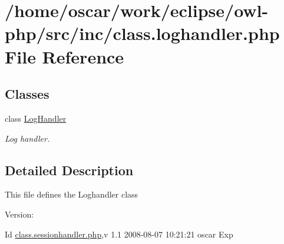 \hypertarget{class_8loghandler_8php}{
\section{/home/oscar/work/eclipse/owl-php/src/inc/class.loghandler.php File Reference}
\label{class_8loghandler_8php}
}
\subsection*{Classes}
\begin{CompactItemize}
\item 
class \hyperlink{classLogHandler}{LogHandler}
\begin{CompactList}\small\item\em Log handler. \item\end{CompactList}\end{CompactItemize}


\subsection{Detailed Description}
This file defines the Loghandler class \begin{Desc}
\item[Version:]\end{Desc}
\begin{Desc}
\item[Id]\hyperlink{class_8sessionhandler_8php}{class.sessionhandler.php},v 1.1 2008-08-07 10:21:21 oscar Exp \end{Desc}

